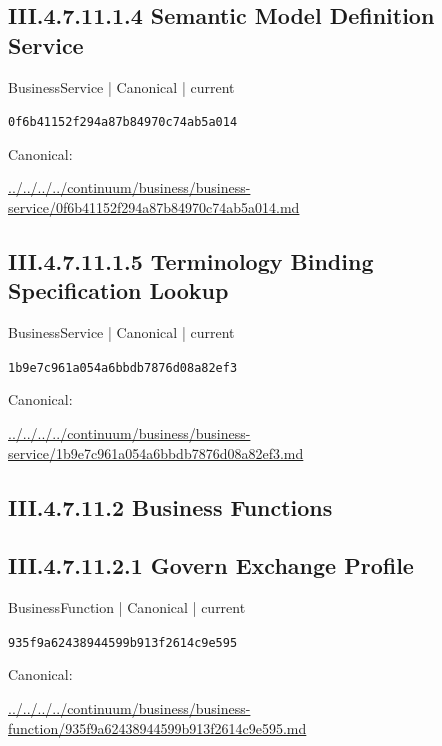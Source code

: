 \documentclass[10pt,a4paper]{article}
\begin{document}
\subsection*{III.4.7.11.1.4 Semantic Model Definition Service}
\label{element-0f6b41152f294a87b84970c74ab5a014}
{\small BusinessService | Canonical | current}\par
\texttt{0f6b41152f294a87b84970c74ab5a014}\par
Canonical: \par
{\footnotesize\url{../../../../continuum/business/business-service/0f6b41152f294a87b84970c74ab5a014.md}}\par
\subsection*{III.4.7.11.1.5 Terminology Binding Specification Lookup}
\label{element-1b9e7c961a054a6bbdb7876d08a82ef3}
{\small BusinessService | Canonical | current}\par
\texttt{1b9e7c961a054a6bbdb7876d08a82ef3}\par
Canonical: \par
{\footnotesize\url{../../../../continuum/business/business-service/1b9e7c961a054a6bbdb7876d08a82ef3.md}}\par
\subsection*{III.4.7.11.2 Business Functions}
\subsection*{III.4.7.11.2.1 Govern Exchange Profile}
\label{element-935f9a62438944599b913f2614c9e595}
{\small BusinessFunction | Canonical | current}\par
\texttt{935f9a62438944599b913f2614c9e595}\par
Canonical: \par
{\footnotesize\url{../../../../continuum/business/business-function/935f9a62438944599b913f2614c9e595.md}}\par
\end{document}

